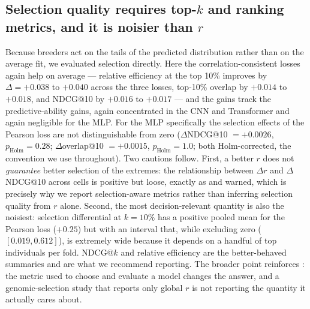 \subsection{Selection quality requires top-$k$ and ranking metrics, and it is
noisier than $r$}
Because breeders act on the tails of the predicted distribution rather than on the
average fit, we evaluated selection directly. Here the correlation-consistent
losses again help on average --- relative efficiency at the top 10\% improves by
$\Delta = +0.038$ to $+0.040$ across the three losses, top-10\% overlap by $+0.014$
to $+0.018$, and NDCG@10 by $+0.016$ to $+0.017$ --- and the gains track the
predictive-ability gains, again concentrated in the CNN and Transformer and again
negligible for the MLP. For the MLP specifically the selection effects of the
Pearson loss are not distinguishable from zero ($\Delta$NDCG@10 $=+0.0026$,
$p_{\mathrm{Holm}}=0.28$; $\Delta$overlap@10 $=+0.0015$, $p_{\mathrm{Holm}}=1.0$;
both Holm-corrected, the convention we use throughout). Two cautions follow. First,
a better $r$ does not \emph{guarantee} better selection of the extremes: the
relationship between $\Delta r$ and $\Delta$NDCG@10 across cells is positive but
loose, exactly as \citet{blondel2015} and \citet{ornella2014} warned, which is
precisely why we report selection-aware metrics rather than inferring selection
quality from $r$ alone. Second, the most decision-relevant quantity is also the
noisiest: selection differential at $k=10\%$ has a positive pooled mean for the
Pearson loss ($+0.25$) but with an interval that, while excluding zero
($[0.019,0.612]$), is extremely wide because it depends on a handful of top
individuals per fold. NDCG@$k$ and relative efficiency are the better-behaved
summaries and are what we recommend reporting. The broader point reinforces
\citet{waldmann2019}: the metric used to choose and evaluate a model changes the
answer, and a genomic-selection study that reports only global $r$ is not
reporting the quantity it actually cares about.

